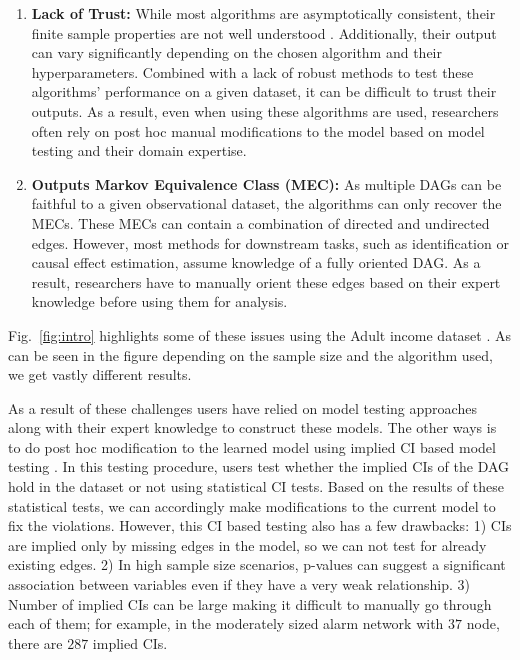 \documentclass{uai2025} %
\begin{document}
\begin{enumerate}
	\item \textbf{Lack of Trust:} While most algorithms are
		asymptotically consistent, their finite sample properties are
		not well understood .
		Additionally, their output can vary significantly depending on
		the chosen algorithm and their hyperparameters. Combined with a
		lack of robust methods to test these algorithms' performance on
		a given dataset, it can be difficult to trust their outputs. As
		a result, even when using these algorithms are used,
		researchers often rely on post hoc manual modifications to the
		model based on model testing and their domain expertise.
	\item \textbf{Outputs Markov Equivalence Class (MEC):} As multiple
		DAGs can be faithful to a given observational dataset, the
		algorithms can only recover the MECs. These MECs can contain a
		combination of directed and undirected edges. However, most
		methods for downstream tasks, such as identification or causal
		effect estimation, assume knowledge of a fully oriented DAG. As
		a result, researchers have to manually orient these edges based
		on their expert knowledge before using them for analysis.
\end{enumerate}

Fig.~\ref{fig:intro} highlights some of these issues using the Adult income
dataset \citep{Becker1996}. As can be seen in the figure depending on the
sample size and the algorithm used, we get vastly different results.

As a result of these challenges users have relied on model testing approaches
along with their expert knowledge to construct these models. The other ways is
to do post hoc modification to the learned model using implied CI based model
testing \citep{Ankan2021, Ankan2023}. In this testing procedure, users test
whether the implied CIs of the DAG hold in the dataset or not using statistical
CI tests. Based on the results of these statistical tests, we can accordingly
make modifications to the current model to fix the violations. However, this CI
based testing also has a few drawbacks: 1) CIs are implied only by missing
edges in the model, so we can not test for already existing edges. 2) In high
sample size scenarios, p-values can suggest a significant association between
variables even if they have a very weak relationship. 3) Number of implied CIs
can be large making it difficult to manually go through each of them; for
example, in the moderately sized alarm network with $ 37 $ node, there are
$287$ implied CIs. 
\end{document}
